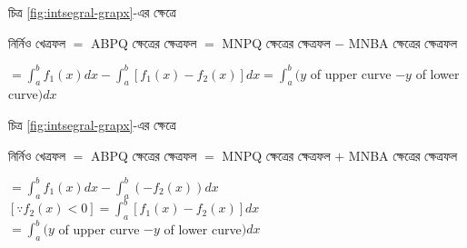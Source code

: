     \begin{minipage}{0.45\textwidth}
        চিত্র \ref{fig:intsegral-grapx}-এর ক্ষেত্রে

        নির্নিও খেত্রফল $=$ ABPQ ক্ষেত্রের ক্ষেত্রফল $=$ MNPQ ক্ষেত্রের ক্ষেত্রফল $-$ MNBA ক্ষেত্রের ক্ষেত্রফল

        $=\int_{a}^{b}f_1(x)dx - \int_{a}^{b}[f_1(x) - f_2(x)]dx = \int_{a}^{b} (y$ of upper curve $- y$ of lower curve$)dx$ 

        \centering
        \label{fig:intsegral-grapx}

        

    \end{minipage}
    \hfill
    \begin{minipage}{0.45\textwidth}
        
        চিত্র \ref{fig:intsegral-grapx}-এর ক্ষেত্রে

        নির্নিও খেত্রফল $=$ ABPQ ক্ষেত্রের ক্ষেত্রফল $=$ MNPQ ক্ষেত্রের ক্ষেত্রফল $+$ MNBA ক্ষেত্রের ক্ষেত্রফল

        $=\int_{a}^{b}f_1(x)dx - \int_{a}^{b}(- f_2(x))dx$ $[\because f_2(x) < 0 ] = \int_{a}^{b}[f_1(x) - f_2(x)]dx$\\
        $= \int_{a}^{b} (y$ of upper curve $- y$ of lower curve$)dx$ 

        \centering
        \label{fig:sintegral-grapd2}
    \end{minipage}

